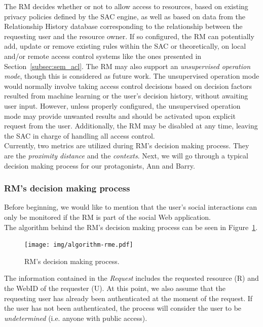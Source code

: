 The RM decides whether or not to allow access to resources, based on existing privacy policies defined by the SAC engine, as well as based on data from the Relationship History database corresponding to the relationship between the requesting user and the resource owner. If so configured, the RM can potentially add, update or remove existing rules within the SAC or theoretically, on local and/or remote access control systems like the ones presented in Section~\ref{subsec:sem_acl}. The RM may also support an \textit{unsupervised operation mode}, though this is considered as future work. The unsupervised operation mode would normally involve taking access control decisions based on decision factors resulted from machine learning or the user's decision history, without awaiting user input. However, unless properly configured, the unsupervised operation mode may provide unwanted results and should be activated upon explicit request from the user. Additionally, the RM may be disabled at any time, leaving the SAC in charge of handling all access control.\\

Currently, two metrics are utilized during RM's decision making process. They are the \textit{proximity distance} and the \textit{contexts}. Next, we will go through a typical decision making process for our protagonists, Ann and Barry.

\subsubsection{RM's decision making process}
Before beginning, we would like to mention that the user's social interactions can only be monitored if the RM is part of the social Web application.\\

The algorithm behind the RM's decision making process can be seen in Figure~\ref{fig:algorithm_rme}.\\

\begin{figure}[h]
  \begin{center}
    \texttt{[image: img/algorithm-rme.pdf]}
        \caption{RM's decision making process.}
        \label{fig:algorithm_rme}
  \end{center}
\end{figure}

The information contained in the \textit{Request} includes the requested resource (R) and the WebID of the requester (U). At this point, we also assume that the requesting user has already been authenticated at the moment of the request. If the user has not been authenticated, the process will consider the user to be \textit{undetermined} (i.e. anyone with public access).\\

